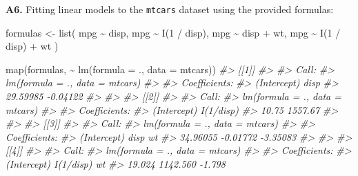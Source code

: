 \documentclass[
]{book}
\newenvironment{Shaded}{\begin{snugshade}}{\end{snugshade}}
\newcommand{\AttributeTok}[1]{\textcolor[rgb]{0.77,0.63,0.00}{#1}}
\newcommand{\CommentTok}[1]{\textcolor[rgb]{0.56,0.35,0.01}{\textit{#1}}}
\newcommand{\DecValTok}[1]{\textcolor[rgb]{0.00,0.00,0.81}{#1}}
\newcommand{\FunctionTok}[1]{\textcolor[rgb]{0.00,0.00,0.00}{#1}}
\newcommand{\NormalTok}[1]{#1}
\newcommand{\OtherTok}[1]{\textcolor[rgb]{0.56,0.35,0.01}{#1}}
\newcommand{\SpecialCharTok}[1]{\textcolor[rgb]{0.00,0.00,0.00}{#1}}
\begin{document}
\textbf{A6.} Fitting linear models to the \texttt{mtcars} dataset using the provided formulas:

\begin{Shaded}
\begin{Highlighting}[]
\NormalTok{formulas }\OtherTok{\textless{}{-}} \FunctionTok{list}\NormalTok{(}
\NormalTok{  mpg }\SpecialCharTok{\textasciitilde{}}\NormalTok{ disp,}
\NormalTok{  mpg }\SpecialCharTok{\textasciitilde{}} \FunctionTok{I}\NormalTok{(}\DecValTok{1} \SpecialCharTok{/}\NormalTok{ disp),}
\NormalTok{  mpg }\SpecialCharTok{\textasciitilde{}}\NormalTok{ disp }\SpecialCharTok{+}\NormalTok{ wt,}
\NormalTok{  mpg }\SpecialCharTok{\textasciitilde{}} \FunctionTok{I}\NormalTok{(}\DecValTok{1} \SpecialCharTok{/}\NormalTok{ disp) }\SpecialCharTok{+}\NormalTok{ wt}
\NormalTok{)}

\FunctionTok{map}\NormalTok{(formulas, }\SpecialCharTok{\textasciitilde{}} \FunctionTok{lm}\NormalTok{(}\AttributeTok{formula =}\NormalTok{ ., }\AttributeTok{data =}\NormalTok{ mtcars))}
\CommentTok{\#\textgreater{} [[1]]}
\CommentTok{\#\textgreater{} }
\CommentTok{\#\textgreater{} Call:}
\CommentTok{\#\textgreater{} lm(formula = ., data = mtcars)}
\CommentTok{\#\textgreater{} }
\CommentTok{\#\textgreater{} Coefficients:}
\CommentTok{\#\textgreater{} (Intercept)         disp  }
\CommentTok{\#\textgreater{}    29.59985     {-}0.04122  }
\CommentTok{\#\textgreater{} }
\CommentTok{\#\textgreater{} }
\CommentTok{\#\textgreater{} [[2]]}
\CommentTok{\#\textgreater{} }
\CommentTok{\#\textgreater{} Call:}
\CommentTok{\#\textgreater{} lm(formula = ., data = mtcars)}
\CommentTok{\#\textgreater{} }
\CommentTok{\#\textgreater{} Coefficients:}
\CommentTok{\#\textgreater{} (Intercept)    I(1/disp)  }
\CommentTok{\#\textgreater{}       10.75      1557.67  }
\CommentTok{\#\textgreater{} }
\CommentTok{\#\textgreater{} }
\CommentTok{\#\textgreater{} [[3]]}
\CommentTok{\#\textgreater{} }
\CommentTok{\#\textgreater{} Call:}
\CommentTok{\#\textgreater{} lm(formula = ., data = mtcars)}
\CommentTok{\#\textgreater{} }
\CommentTok{\#\textgreater{} Coefficients:}
\CommentTok{\#\textgreater{} (Intercept)         disp           wt  }
\CommentTok{\#\textgreater{}    34.96055     {-}0.01772     {-}3.35083  }
\CommentTok{\#\textgreater{} }
\CommentTok{\#\textgreater{} }
\CommentTok{\#\textgreater{} [[4]]}
\CommentTok{\#\textgreater{} }
\CommentTok{\#\textgreater{} Call:}
\CommentTok{\#\textgreater{} lm(formula = ., data = mtcars)}
\CommentTok{\#\textgreater{} }
\CommentTok{\#\textgreater{} Coefficients:}
\CommentTok{\#\textgreater{} (Intercept)    I(1/disp)           wt  }
\CommentTok{\#\textgreater{}      19.024     1142.560       {-}1.798}
\end{Highlighting}
\end{Shaded}
\end{document}
